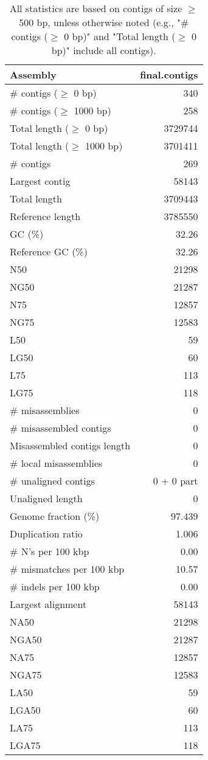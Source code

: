 \documentclass[12pt,a4paper]{article}
\begin{document}
\begin{table}[ht]
\begin{center}
\caption{All statistics are based on contigs of size $\geq$ 500 bp, unless otherwise noted (e.g., "\# contigs ($\geq$ 0 bp)" and "Total length ($\geq$ 0 bp)" include all contigs).}
\begin{tabular}{|l*{1}{|r}|}
\hline
Assembly & final.contigs \\ \hline
\# contigs ($\geq$ 0 bp) & 340 \\ \hline
\# contigs ($\geq$ 1000 bp) & 258 \\ \hline
Total length ($\geq$ 0 bp) & 3729744 \\ \hline
Total length ($\geq$ 1000 bp) & 3701411 \\ \hline
\# contigs & 269 \\ \hline
Largest contig & 58143 \\ \hline
Total length & 3709443 \\ \hline
Reference length & 3785550 \\ \hline
GC (\%) & 32.26 \\ \hline
Reference GC (\%) & 32.26 \\ \hline
N50 & 21298 \\ \hline
NG50 & 21287 \\ \hline
N75 & 12857 \\ \hline
NG75 & 12583 \\ \hline
L50 & 59 \\ \hline
LG50 & 60 \\ \hline
L75 & 113 \\ \hline
LG75 & 118 \\ \hline
\# misassemblies & 0 \\ \hline
\# misassembled contigs & 0 \\ \hline
Misassembled contigs length & 0 \\ \hline
\# local misassemblies & 0 \\ \hline
\# unaligned contigs & 0 + 0 part \\ \hline
Unaligned length & 0 \\ \hline
Genome fraction (\%) & 97.439 \\ \hline
Duplication ratio & 1.006 \\ \hline
\# N's per 100 kbp & 0.00 \\ \hline
\# mismatches per 100 kbp & 10.57 \\ \hline
\# indels per 100 kbp & 0.00 \\ \hline
Largest alignment & 58143 \\ \hline
NA50 & 21298 \\ \hline
NGA50 & 21287 \\ \hline
NA75 & 12857 \\ \hline
NGA75 & 12583 \\ \hline
LA50 & 59 \\ \hline
LGA50 & 60 \\ \hline
LA75 & 113 \\ \hline
LGA75 & 118 \\ \hline
\end{tabular}
\end{center}
\end{table}
\end{document}
